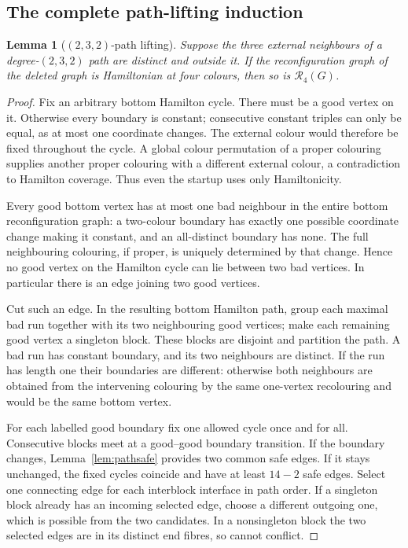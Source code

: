 \documentclass[11pt]{article}
\newtheorem{lemma}[theorem]{Lemma}
\theoremstyle{remark}
\newcommand{\R}{\mathcal R}
\numberwithin{equation}{section}
\numberwithin{table}{section}
\begin{document}
\subsection{The complete path-lifting induction}
\begin{lemma}[$(2,3,2)$-path lifting]\label{lem:path232}
Suppose the three external neighbours of a degree-$(2,3,2)$ path are
distinct and outside it. If the reconfiguration graph of the deleted
graph is Hamiltonian at four colours, then so is $\R_4(G)$.
\end{lemma}
\begin{proof}
Fix an arbitrary bottom Hamilton cycle. There must be a good vertex
on it. Otherwise every boundary is constant; consecutive constant
triples can only be equal, as at most one coordinate changes. The
external colour would therefore be fixed throughout the cycle. A
global colour permutation of a proper colouring supplies another
proper colouring with a different external colour, a contradiction
to Hamilton coverage. Thus even the startup uses only Hamiltonicity.

Every good bottom vertex has at most one bad neighbour in the entire
bottom reconfiguration graph: a two-colour boundary has exactly one
possible coordinate change making it constant, and an all-distinct
boundary has none. The full neighbouring colouring, if proper, is
uniquely determined by that change. Hence no good vertex on the
Hamilton cycle can lie between two bad vertices. In particular there
is an edge joining two good vertices.

Cut such an edge. In the resulting bottom Hamilton path, group each
maximal bad run together with its two neighbouring good vertices;
make each remaining good vertex a singleton block. These blocks are
disjoint and partition the path. A bad run has constant boundary,
and its two neighbours are distinct. If the run has length one their
boundaries are different: otherwise both neighbours are obtained from
the intervening colouring by the same one-vertex recolouring and
would be the same bottom vertex.

For each labelled good boundary fix one allowed cycle once and for
all. Consecutive blocks meet at a good--good boundary transition.
If the boundary changes, Lemma~\ref{lem:pathsafe} provides two common
safe edges. If it stays unchanged, the fixed cycles coincide and
have at least $14-2$ safe edges. Select one connecting edge for each
interblock interface in path order. If a singleton block already has
an incoming selected edge, choose a different outgoing one, which is
possible from the two candidates. In a nonsingleton block the two
selected edges are in its distinct end fibres, so cannot conflict.


\end{proof}
\end{document}
